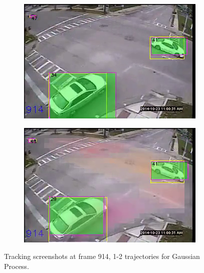 \begin{figure}
\centering
    \begin{subfigure}{0.43\linewidth}
        \includegraphics[width=\linewidth]{./img/gp/193402-kf-2.png}
        \label{subfig:kf-2}
    \end{subfigure}
    \begin{subfigure}{0.43\linewidth}
        \includegraphics[width=\linewidth]{./img/gp/193402-gp-2.png}
        \label{subfig:gp-2}
    \end{subfigure}%
    \caption{Tracking screenshots at frame 914, 1-2 trajectories for Gaussian Process.}
    \label{fig:kf-gp-2}
\end{figure}

